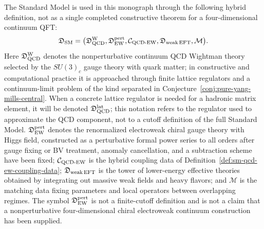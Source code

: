 \begin{definition}
\label{def:hybrid-standard-model-definition}
The Standard Model is used in this monograph through the following hybrid
definition, not as a single completed constructive theorem for a
four-dimensional continuum QFT:
\[
  \mathfrak D_{\rm SM}
  =
  \bigl(
    \mathfrak D_{\rm QCD}^{\rm W},
    \mathfrak D_{\rm EW}^{\rm pert},
    \mathcal C_{\rm QCD\text{-}EW},
    \mathfrak D_{\rm weak\,EFT},
    \mathcal M
  \bigr).
\]
Here \(\mathfrak D_{\rm QCD}^{\rm W}\) denotes the nonperturbative continuum
QCD Wightman theory selected by the \(SU(3)_c\) gauge theory with quark
matter; in constructive and computational practice it is approached through
finite lattice regulators and a continuum-limit problem of the kind separated
in Conjecture~\ref{conj:pure-yang-mills-central}.  When a concrete
lattice regulator is needed for a hadronic matrix element, it will be denoted
\(\mathfrak D_{\rm QCD}^{\rm lat}\); this notation refers to the regulator
used to approximate the QCD component, not to a cutoff definition of the full
Standard Model.
\(\mathfrak D_{\rm EW}^{\rm pert}\) denotes the renormalized electroweak
chiral gauge theory with Higgs field, constructed as a perturbative formal
power series to all orders after gauge fixing or BV treatment, anomaly
cancellation, and a subtraction scheme have been fixed;
\(\mathcal C_{\rm QCD\text{-}EW}\) is the hybrid coupling data of
Definition~\ref{def:sm-qcd-ew-coupling-data};
\(\mathfrak D_{\rm weak\,EFT}\) is the tower of lower-energy effective
theories obtained by integrating out massive weak fields and heavy flavors;
and \(\mathcal M\) is the matching data fixing parameters and local operators
between overlapping regimes.  The symbol
\(\mathfrak D_{\rm EW}^{\rm pert}\) is not a finite-cutoff definition and is
not a claim that a nonperturbative four-dimensional chiral electroweak
continuum construction has been supplied.
\end{definition}

